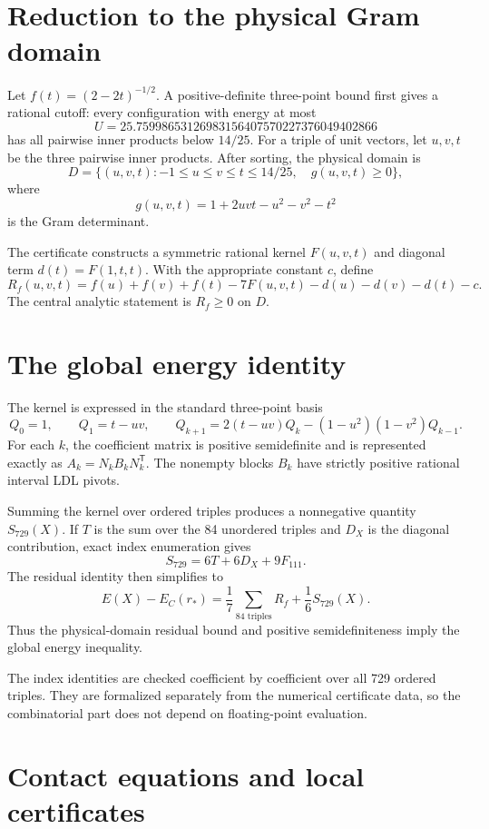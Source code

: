 \documentclass[11pt]{article}
\theoremstyle{definition}
\theoremstyle{remark}
\begin{document}
\section{Reduction to the physical Gram domain}

Let $f(t)=(2-2t)^{-1/2}$.  A positive-definite three-point bound first gives a rational cutoff: every configuration with energy at most
\[
 U=25.75998653126983156407570227376049402866
\]
has all pairwise inner products below $14/25$.  For a triple of unit vectors, let $u,v,t$ be the three pairwise inner products.  After sorting, the physical domain is
\[
 D=\{(u,v,t):-1\leq u\leq v\leq t\leq14/25,\quad
 g(u,v,t)\geq0\},
\]
where
\[
 g(u,v,t)=1+2uvt-u^2-v^2-t^2
\]
is the Gram determinant.

The certificate constructs a symmetric rational kernel $F(u,v,t)$ and diagonal term $d(t)=F(1,t,t)$.  With the appropriate constant $c$, define
\[
 R_f(u,v,t)=f(u)+f(v)+f(t)-7F(u,v,t)-d(u)-d(v)-d(t)-c.
\]
The central analytic statement is $R_f\geq0$ on $D$.

\section{The global energy identity}

The kernel is expressed in the standard three-point basis
\[
 Q_0=1,\qquad Q_1=t-uv,\qquad
 Q_{k+1}=2(t-uv)Q_k-(1-u^2)(1-v^2)Q_{k-1}.
\]
For each $k$, the coefficient matrix is positive semidefinite and is represented exactly as $A_k=N_kB_kN_k^{\mathsf T}$.  The nonempty blocks $B_k$ have strictly positive rational interval LDL pivots.

Summing the kernel over ordered triples produces a nonnegative quantity $S_{729}(X)$.  If $T$ is the sum over the 84 unordered triples and $D_X$ is the diagonal contribution, exact index enumeration gives
\[
 S_{729}=6T+6D_X+9F_{111}.
\]
The residual identity then simplifies to
\[
 E(X)-E_C(r_*)=\frac17\sum_{\text{84 triples}}R_f
                 +\frac16 S_{729}(X).
\]
Thus the physical-domain residual bound and positive semidefiniteness imply the global energy inequality.

The index identities are checked coefficient by coefficient over all 729 ordered triples.  They are formalized separately from the numerical certificate data, so the combinatorial part does not depend on floating-point evaluation.

\section{Contact equations and local certificates}
\end{document}
